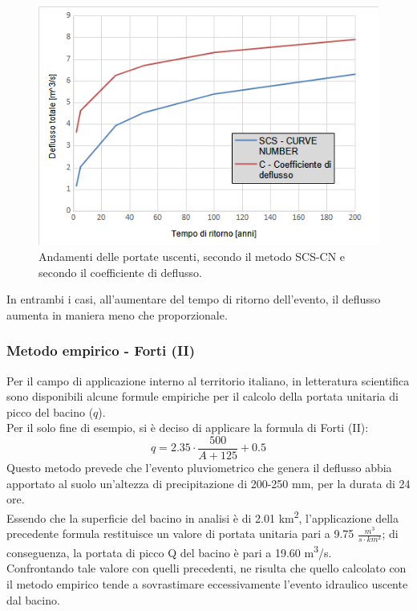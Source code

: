 \begin{figure}[H]  \centering
    \includegraphics[scale=0.75]{immagini/metodo_razionale_cn_c.png}
    \caption{Andamenti delle portate uscenti, secondo il metodo SCS-CN e secondo il coefficiente di deflusso.}
    \label{metodo_razionale_cn_c}
\end{figure}
In entrambi i casi, all'aumentare del tempo di ritorno dell'evento, il deflusso aumenta in maniera meno che proporzionale.

\subsubsection{Metodo empirico - Forti (II)}
Per il campo di applicazione interno al territorio italiano, in letteratura scientifica sono disponibili alcune formule empiriche per il calcolo della portata unitaria di picco del bacino ($q$).\\
Per il solo fine di esempio, si è deciso di applicare la formula di Forti (II):
\begin{equation}
    q = 2.35 \cdot \frac{500}{A+125}+0.5
\end{equation}
Questo metodo prevede che l'evento pluviometrico che genera il deflusso abbia apportato al suolo un'altezza di precipitazione di 200-250 mm, per la durata di 24 ore.\\
Essendo che la superficie del bacino in analisi è di 2.01 \unit{km^2}, l'applicazione della precedente formula restituisce un valore di portata unitaria pari a 9.75 $\frac{m^3}{s \cdot km^2}$; di conseguenza, la portata di picco Q del bacino è pari a 19.60 \unit{m^3/s}.\\
Confrontando tale valore con quelli precedenti, ne risulta che quello calcolato con il metodo empirico tende a sovrastimare eccessivamente l'evento idraulico uscente dal bacino.


